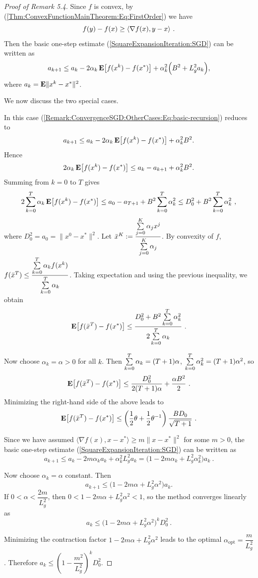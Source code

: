 \begin{proof}[Proof of Remark 5.4]
Since $f$ is convex, by (\ref{Thm:ConvexFunctionMainTheorem:Eq:FirstOrder}) we have $$f(y)-f(x)\geq \langle \nabla f(x), y-x \rangle \ .$$ 
Then the basic one-step estimate (\ref{SquareExpansionIteration:SGD}) can be written as
\begin{equation}\label{Remark:ConvergenceSGD:OtherCases:Eq:basic-recursion}
a_{k+1}
\le
a_k
-2\alpha_k\,\mathbf E\bigl[f(x^k)-f(x^*)\bigr]
+\alpha_k^2\Bigl(B^2+L_g^2 a_k\Bigr),
\end{equation}
where $a_k=\mathbf E \|x^k-x^*\|^2$.

We now discuss the two special cases.

 In this case (\ref{Remark:ConvergenceSGD:OtherCases:Eq:basic-recursion}) reduces to
\[
a_{k+1}
\le
a_k
-2\alpha_k\,\mathbf E \bigl[f(x^k)-f(x^*)\bigr]
+\alpha_k^2 B^2.
\]
Hence
\[
2\alpha_k\,\mathbf E \bigl[f(x^k)-f(x^*)\bigr]
\le
a_k-a_{k+1}+\alpha_k^2 B^2.
\]
Summing from $k=0$ to $T$ gives
\[
2\sum_{k=0}^T \alpha_k\,\mathbf E \bigl[f(x^k)-f(x^*)\bigr]
\le
a_0-a_{T+1}+B^2\sum_{k=0}^T \alpha_k^2
\le
D_0^2+B^2\sum_{k=0}^T \alpha_k^2 \ ,
\]
where $D_0^2=a_0=\|x^0-x^*\|^2$. 
Let $\bar x^K:=\dfrac{\sum\limits_{j=0}^K \alpha_j x^j}{\sum\limits_{j=0}^K \alpha_j}$. By convexity of $f$,
$
f(\bar x^T)
\le
\dfrac{\sum\limits_{k=0}^T \alpha_k f(x^k)}{\sum\limits_{k=0}^T \alpha_k}$. Taking expectation and using the previous inequality, we obtain
\[
\E \bigl[f(\bar x^T)-f(x^*)\bigr]
\le
\dfrac{D_0^2+B^2\sum\li_{k=0}^T \alpha_k^2}{2\sum\li_{k=0}^T \alpha_k} \ .
\]

Now choose $\alpha_k=\alpha>0$ for all $k$. Then $\sum\limits_{k=0}^T \alpha_k=(T+1)\alpha$,
$\sum\limits_{k=0}^T \alpha_k^2=(T+1)\alpha^2$,
so
$$
\mathbf E\bigl[f(\bar x^T)-f(x^*)\bigr]
\le
\frac{D_0^2}{2(T+1)\alpha}+\frac{\alpha B^2}{2} \ .$$
Minimizing the right-hand side of the above leads to $$\mathbf E \bigl[f(\bar x^T)-f(x^*)\bigr]
\le
\left(\frac{1}{2}\theta+\frac{1}{2}\theta^{-1}\right)
\frac{BD_0}{\sqrt{T+1}} \ .$$

Since we have assumed $\langle \nabla f(x),x-x^*\rangle \ge m\|x-x^*\|^2$ for some $m>0$, the basic one-step estimate (\ref{SquareExpansionIteration:SGD}) can be written as
$$a_{k+1}
\le
a_k-2m\alpha_k a_k+\alpha_k^2 L_g^2 a_k
=
\bigl(1-2m\alpha_k+L_g^2\alpha_k^2\bigr)a_k \ .$$

Now choose $\alpha_k=\alpha$ constant. Then
\[
a_{k+1}\le \bigl(1-2m\alpha+L_g^2\alpha^2\bigr)a_k.
\]
If
$0<\alpha<\dfrac{2m}{L_g^2}$,
then
$0<1-2m\alpha+L_g^2\alpha^2<1$,
so the method converges linearly as
$$
a_k
\le
\bigl(1-2m\alpha+L_g^2\alpha^2\bigr)^k D_0^2 \ .$$

Minimizing the contraction factor $1-2m\alpha+L_g^2\alpha^2$ leads to the optimal $
\alpha_{\mathrm{opt}}=\dfrac{m}{L_g^2}$.
Therefore
$a_k
\le
\left(1-\dfrac{m^2}{L_g^2}\right)^k D_0^2$.
\end{proof}


